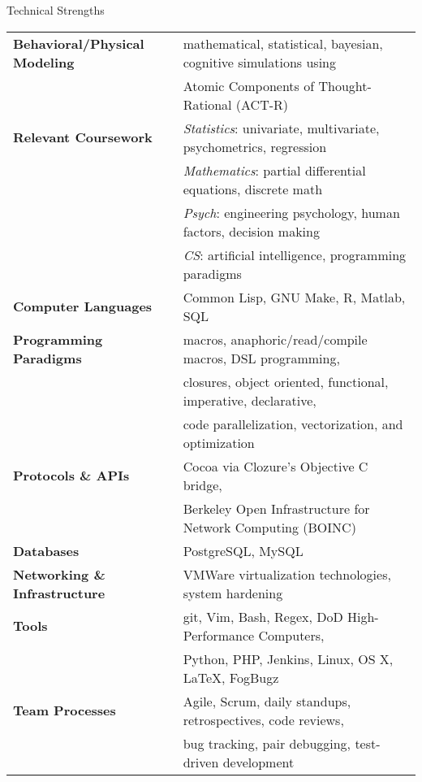 

\begin{rSection}{Technical Strengths}
  \begin{tabular}{ @{} >{\bfseries}l @{\hspace{4ex}} l }
    Behavioral/Physical Modeling &	mathematical, statistical, bayesian, cognitive simulations using \\
    &					Atomic Components of Thought-Rational (ACT-R) \\
    [.1cm]
    Relevant Coursework &		\emph{Statistics}: univariate, multivariate, psychometrics, regression \\
    &					\emph{Mathematics}: partial differential equations, discrete math \\
    &					\emph{Psych}: engineering psychology, human factors, decision making \\ 
    &					\emph{CS}: artificial intelligence, programming paradigms \\
    [.1cm]
    Computer Languages &		Common Lisp, GNU Make, R, Matlab, SQL \\
    [.1cm]
    Programming Paradigms &		macros, anaphoric/read/compile macros, DSL programming, \\
    & 					closures, object oriented, functional, imperative, declarative, \\
    &					code parallelization, vectorization, and optimization \\
    [.1cm]
    Protocols \& APIs & 		Cocoa via Clozure's Objective C bridge, \\
    &					Berkeley Open Infrastructure for Network Computing (BOINC) \\
    [.1cm]
    Databases &				PostgreSQL, MySQL \\
    [.1cm]
    Networking \& Infrastructure &	VMWare virtualization technologies, system hardening \\
    [.1cm]
    Tools & 				git, Vim, Bash, Regex, DoD High-Performance Computers, \\
    &					Python, PHP, Jenkins, Linux, OS X, \LaTeX, FogBugz \\
    [.1cm]
    Team Processes & 			Agile, Scrum, daily standups, retrospectives, code reviews, \\
    & 					bug tracking, pair debugging, test-driven development \\
  \end{tabular}
\end{rSection}


